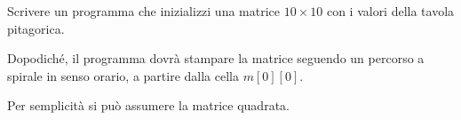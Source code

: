 \begin{Exercise}[label={ex:spirale}]
  Scrivere un programma che inizializzi una matrice $10 \times 10$ con i valori della tavola pitagorica.

  Dopodich\'e, il programma dovr\`a stampare la matrice seguendo un percorso a spirale in senso orario, a partire dalla cella $m[0][0]$.

  Per semplicit\`a si pu\`o assumere la matrice quadrata.
\end{Exercise}

\begin{Answer}[ref={ex:spirale}]
  
\end{Answer}
